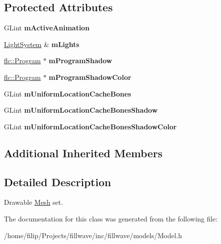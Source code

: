 \subsection*{Protected Attributes}
\begin{DoxyCompactItemize}
\item 
G\+Lint {\bfseries m\+Active\+Animation}\hypertarget{classflw_1_1flf_1_1Model_a85e6d546b0e1224c8a7f36fc282a8a20}{}\label{classflw_1_1flf_1_1Model_a85e6d546b0e1224c8a7f36fc282a8a20}

\item 
\hyperlink{classflw_1_1flf_1_1LightSystem}{Light\+System} \& {\bfseries m\+Lights}\hypertarget{classflw_1_1flf_1_1Model_a8017e514a989de4cb271cc4c5c8dc91b}{}\label{classflw_1_1flf_1_1Model_a8017e514a989de4cb271cc4c5c8dc91b}

\item 
\hyperlink{classflw_1_1flc_1_1Program}{flc\+::\+Program} $\ast$ {\bfseries m\+Program\+Shadow}\hypertarget{classflw_1_1flf_1_1Model_afbb823836bab8841ccebae5c5f8dad5f}{}\label{classflw_1_1flf_1_1Model_afbb823836bab8841ccebae5c5f8dad5f}

\item 
\hyperlink{classflw_1_1flc_1_1Program}{flc\+::\+Program} $\ast$ {\bfseries m\+Program\+Shadow\+Color}\hypertarget{classflw_1_1flf_1_1Model_a8362a0a86e1a9b2c7ec8a2502492a51f}{}\label{classflw_1_1flf_1_1Model_a8362a0a86e1a9b2c7ec8a2502492a51f}

\item 
G\+Lint {\bfseries m\+Uniform\+Location\+Cache\+Bones}\hypertarget{classflw_1_1flf_1_1Model_a5e363c4ac049d94802149faf08884e89}{}\label{classflw_1_1flf_1_1Model_a5e363c4ac049d94802149faf08884e89}

\item 
G\+Lint {\bfseries m\+Uniform\+Location\+Cache\+Bones\+Shadow}\hypertarget{classflw_1_1flf_1_1Model_afb838c23faceb9fb81c0b52006ee0eca}{}\label{classflw_1_1flf_1_1Model_afb838c23faceb9fb81c0b52006ee0eca}

\item 
G\+Lint {\bfseries m\+Uniform\+Location\+Cache\+Bones\+Shadow\+Color}\hypertarget{classflw_1_1flf_1_1Model_a17d9e9f5ab171c3e65faf964618e3961}{}\label{classflw_1_1flf_1_1Model_a17d9e9f5ab171c3e65faf964618e3961}

\end{DoxyCompactItemize}
\subsection*{Additional Inherited Members}


\subsection{Detailed Description}
Drawable \hyperlink{classflw_1_1flf_1_1Mesh}{Mesh} set. 

The documentation for this class was generated from the following file\+:\begin{DoxyCompactItemize}
\item 
/home/filip/\+Projects/fillwave/inc/fillwave/models/Model.\+h\end{DoxyCompactItemize}
